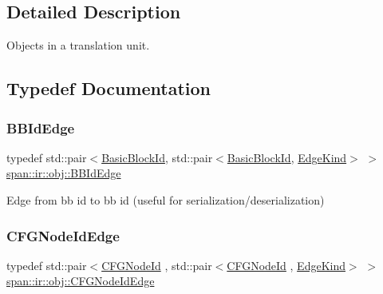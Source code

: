\subsection{Detailed Description}
Objects in a translation unit. 

\subsection{Typedef Documentation}
\mbox{\label{namespacespan_1_1ir_1_1obj_a67ae67fe77ea84d3152bc68919e50c7f}} 
\subsubsection{\texorpdfstring{B\+B\+Id\+Edge}{BBIdEdge}}
{\footnotesize\ttfamily typedef std\+::pair$<$\hyperlink{namespacespan_ab988dafbd25ab39838239b91d6a86214}{Basic\+Block\+Id}, std\+::pair$<$\hyperlink{namespacespan_ab988dafbd25ab39838239b91d6a86214}{Basic\+Block\+Id}, \hyperlink{namespacespan_1_1ir_1_1obj_a3687553dc31f18fb1bd62e0798a3f7f0}{Edge\+Kind}$>$ $>$ \hyperlink{namespacespan_1_1ir_1_1obj_a67ae67fe77ea84d3152bc68919e50c7f}{span\+::ir\+::obj\+::\+B\+B\+Id\+Edge}}



Edge from bb id to bb id (useful for serialization/deserialization) 

\mbox{\label{namespacespan_1_1ir_1_1obj_a8896662ab566cd79d401c0753d3c4120}} 
\subsubsection{\texorpdfstring{C\+F\+G\+Node\+Id\+Edge}{CFGNodeIdEdge}}
{\footnotesize\ttfamily typedef std\+::pair$<$\hyperlink{namespacespan_a34e8d849ca2007fe03cb1817685d08bf}{C\+F\+G\+Node\+Id} , std\+::pair$<$\hyperlink{namespacespan_a34e8d849ca2007fe03cb1817685d08bf}{C\+F\+G\+Node\+Id} , \hyperlink{namespacespan_1_1ir_1_1obj_a3687553dc31f18fb1bd62e0798a3f7f0}{Edge\+Kind}$>$ $>$ \hyperlink{namespacespan_1_1ir_1_1obj_a8896662ab566cd79d401c0753d3c4120}{span\+::ir\+::obj\+::\+C\+F\+G\+Node\+Id\+Edge}}



